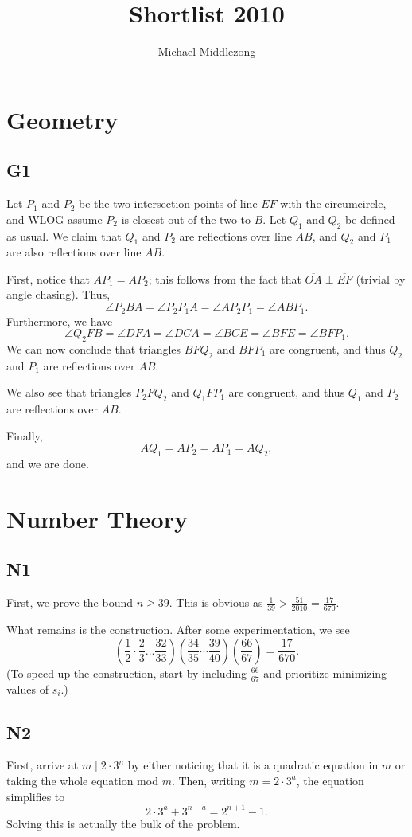 \documentclass{scrartcl}
\title{Shortlist 2010}
\author{Michael Middlezong}
\begin{document}
\maketitle

\section*{Geometry}
\subsection*{G1}
Let $P_1$ and $P_2$ be the two intersection points of line $EF$ with the circumcircle, and WLOG assume $P_2$ is closest out of the two to $B$.
Let $Q_1$ and $Q_2$ be defined as usual.
We claim that $Q_1$ and $P_2$ are reflections over line $AB$, and $Q_2$ and $P_1$ are also reflections over line $AB$.

First, notice that $AP_1 = AP_2$; this follows from the fact that $\overline{OA} \perp \overline{EF}$ (trivial by angle chasing).
Thus,
\[ \angle P_2BA = \angle P_2P_1A = \angle AP_2P_1 = \angle ABP_1. \]
Furthermore, we have
\[ \angle Q_2FB = \angle DFA = \angle DCA = \angle BCE = \angle BFE = \angle BFP_1. \]
We can now conclude that triangles $BFQ_2$ and $BFP_1$ are congruent, and thus $Q_2$ and $P_1$ are reflections over $AB$.

We also see that triangles $P_2FQ_2$ and $Q_1FP_1$ are congruent, and thus $Q_1$ and $P_2$ are reflections over $AB$.

Finally,
\[ AQ_1 = AP_2 = AP_1 = AQ_2, \]
and we are done.

\section*{Number Theory}
\subsection*{N1}
First, we prove the bound $n \geq 39$.
This is obvious as $\frac{1}{39} > \frac{51}{2010} = \frac{17}{670}$.

What remains is the construction.
After some experimentation, we see
\[ \left(\frac{1}{2} \cdot \frac23 \dots \frac{32}{33} \right)\left( \frac{34}{35} \cdots \frac{39}{40} \right)\left(\frac{66}{67} \right) = \frac{17}{670}. \]
(To speed up the construction, start by including $\frac{66}{67}$ and prioritize minimizing values of $s_i$.)

\subsection*{N2}
First, arrive at $m \mid 2 \cdot 3^n$ by either noticing that it is a quadratic equation in $m$ or taking the whole equation mod $m$.
Then, writing $m = 2 \cdot 3^a$, the equation simplifies to
\[ 2 \cdot 3^a + 3^{n-a} = 2^{n+1} - 1. \]
Solving this is actually the bulk of the problem.
\end{document}

